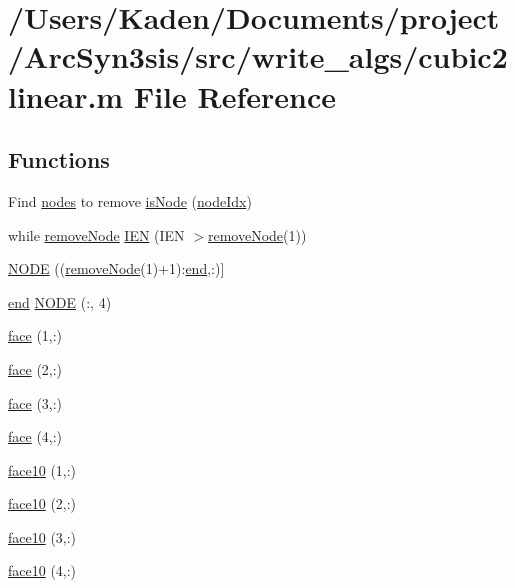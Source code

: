 \hypertarget{a00605}{}\section{/\+Users/\+Kaden/\+Documents/project/\+Arc\+Syn3sis/src/write\+\_\+algs/cubic2linear.m File Reference}
\label{a00605}
\subsection*{Functions}
\begin{DoxyCompactItemize}
\item 
Find \hyperlink{a00608_a9fd973fb7dcbed4123ae5eb2f3868e61}{nodes} to remove \hyperlink{a00605_afc9289da26bc38f7028f9de5824c2c72}{is\+Node} (\hyperlink{a00605_a3891165b790964e5812b60f12517cbe9}{node\+Idx})
\item 
while \hyperlink{a00605_ae344a0a545940b078e36623bf4b44c7f}{remove\+Node} \hyperlink{a00605_a85c9d772fb8d822065a07de57bc00de0}{I\+EN} (I\+EN $>$\hyperlink{a00605_ae344a0a545940b078e36623bf4b44c7f}{remove\+Node}(1))
\item 
\hyperlink{a00605_a16a42e57356dc625f7f62a0e3228d33e}{N\+O\+DE} ((\hyperlink{a00605_ae344a0a545940b078e36623bf4b44c7f}{remove\+Node}(1)+1)\+:\hyperlink{a00608_afb358f48b1646c750fb9da6c6585be2b}{end},\+:)\mbox{]}
\item 
\hyperlink{a00608_afb358f48b1646c750fb9da6c6585be2b}{end} \hyperlink{a00605_a06e5a2f70e4c38c9b781313f2818c3a9}{N\+O\+DE} (\+:, 4)
\item 
\hyperlink{a00605_a9109c446b437fff787b51f7eb55988c3}{face} (1,\+:)
\item 
\hyperlink{a00605_ac5bf1b71e187f9509de1f13415fadd23}{face} (2,\+:)
\item 
\hyperlink{a00605_a2f070a21ac519a099c6eb56f4902f34e}{face} (3,\+:)
\item 
\hyperlink{a00605_ac4ec0037ba529da25bf084669a45f60c}{face} (4,\+:)
\item 
\hyperlink{a00605_ad60e7a72b33bc795c03ae66c15f7dde1}{face10} (1,\+:)
\item 
\hyperlink{a00605_a787cbb56046a32759c03b4f2c3430f7f}{face10} (2,\+:)
\item 
\hyperlink{a00605_ad9821b33490122d0d4d7d2db8fe221be}{face10} (3,\+:)
\item 
\hyperlink{a00605_a3bbe5679713621dfed463de2750ab6e8}{face10} (4,\+:)

\end{DoxyCompactItemize}
